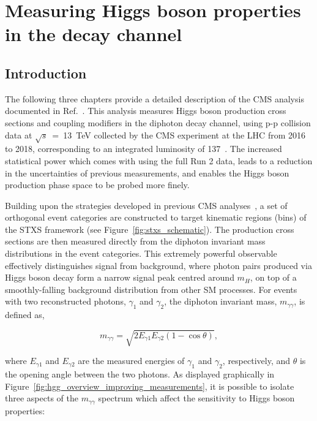\chapter{Measuring Higgs boson properties in the \Hgg decay channel}
\label{chap:hgg_overview}

\section{Introduction}\label{sec:hgg_introduction}
The following three chapters provide a detailed description of the CMS \Hgg analysis documented in Ref.~\cite{Sirunyan:2021ybb}. This analysis measures Higgs boson production cross sections and coupling modifiers in the diphoton decay channel, using p-p collision data at $\sqrt{s}$~=~13~TeV collected by the CMS experiment at the LHC from 2016 to 2018, corresponding to an integrated luminosity of 137~\fbinv. The increased statistical power which comes with using the full Run 2 data, leads to a reduction in the uncertainties of previous \Hgg measurements, and enables the Higgs boson production phase space to be probed more finely.

Building upon the strategies developed in previous CMS \Hgg analyses~\cite{Sirunyan:2018ouh,CMS-PAS-HIG-18-029,Sirunyan:2020sum}, a set of orthogonal event categories are constructed to target kinematic regions (bins) of the STXS framework (see Figure~\ref{fig:stxs_schematic}). The production cross sections are then measured directly from the diphoton invariant mass distributions in the event categories. This extremely powerful observable effectively distinguishes signal from background, where photon pairs produced via Higgs boson decay form a narrow signal peak centred around $m_H$, on top of a smoothly-falling background distribution from other SM processes. For events with two reconstructed photons, $\gamma_1$ and $\gamma_2$, the diphoton invariant mass, $m_{\gamma\gamma}$, is defined as,

\begin{equation}\label{eq:mgg}
    m_{\gamma\gamma} = \sqrt{2E_{\gamma1}E_{\gamma2}(1-\cos{\theta})},
\end{equation}

\noindent
where $E_{\gamma1}$ and $E_{\gamma2}$ are the measured energies of $\gamma_1$ and $\gamma_2$, respectively, and $\theta$ is the opening angle between the two photons. As displayed graphically in Figure~\ref{fig:hgg_overview_improving_measurements}, it is possible to isolate three aspects of the $m_{\gamma\gamma}$ spectrum which affect the sensitivity to Higgs boson properties: 

